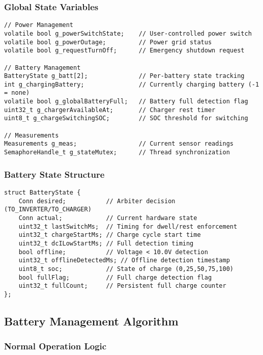 \documentclass[11pt,a4paper]{article}
\begin{document}
\subsubsection{Global State Variables}

\begin{lstlisting}[caption=Global State Variables]
// Power Management
volatile bool g_powerSwitchState;    // User-controlled power switch
volatile bool g_powerOutage;         // Power grid status
volatile bool g_requestTurnOff;      // Emergency shutdown request

// Battery Management
BatteryState g_batt[2];              // Per-battery state tracking
int g_chargingBattery;               // Currently charging battery (-1 = none)
volatile bool g_globalBatteryFull;   // Battery full detection flag
uint32_t g_chargerAvailableAt;       // Charger rest timer
uint8_t g_chargeSwitchingSOC;        // SOC threshold for switching

// Measurements
Measurements g_meas;                 // Current sensor readings
SemaphoreHandle_t g_stateMutex;      // Thread synchronization
\end{lstlisting}

\subsubsection{Battery State Structure}

\begin{lstlisting}[caption=Battery State Structure]
struct BatteryState {
    Conn desired;           // Arbiter decision (TO_INVERTER/TO_CHARGER)
    Conn actual;            // Current hardware state
    uint32_t lastSwitchMs;  // Timing for dwell/rest enforcement
    uint32_t chargeStartMs; // Charge cycle start time
    uint32_t dcILowStartMs; // Full detection timing
    bool offline;           // Voltage < 10.0V detection
    uint32_t offlineDetectedMs; // Offline detection timestamp
    uint8_t soc;            // State of charge (0,25,50,75,100)
    bool fullFlag;          // Full charge detection flag
    uint32_t fullCount;     // Persistent full charge counter
};
\end{lstlisting}

\subsection{Battery Management Algorithm}

\subsubsection{Normal Operation Logic}
\end{document}
